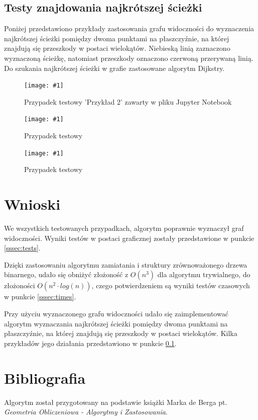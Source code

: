 \documentclass[12pt]{article}
\let\tempone\itemize
\let\temptwo\enditemize
\renewenvironment{itemize}{\tempone\setlength{\itemsep}{0cm}}{\temptwo}
\newcommand{\imgcustomsize}[3]{
	\begin{figure}[H]
		\centering
		\texttt{[image: \#1]}
		\caption{#2}
		\label{#1}
	\end{figure}
}
\begin{document}
		\subsection{Testy znajdowania najkrótszej ścieżki} \label{sssec:tests2}
			
			Poniżej przedstawiono przykłady zastosowania grafu widoczności do wyznaczenia najkrótszej ścieżki pomiędzy dwoma punktami na płaszczyźnie, na której znajdują się przeszkody w postaci wielokątów. Niebieską linią zaznaczono wyznaczoną ścieżkę, natomiast przeszkody oznaczono czerwoną przerywaną linią. Do szukania najkrótszej ścieżki w grafie zastosowane algorytm Dijkstry.
		
			\imgcustomsize{przyklad2.jpg}{Przypadek testowy 'Przykład 2' zawarty w pliku Jupyter Notebook}{1}
			\imgcustomsize{p1.jpg}{Przypadek testowy}{0.75}
			\imgcustomsize{p2.jpg}{Przypadek testowy}{0.75}
			\newpage
			
	\section{Wnioski}
		\begin{itemize}
			\item We wszystkich testowanych przypadkach, algorytm poprawnie wyznaczył graf widoczności. Wyniki testów w postaci graficznej zostały przedstawione w punkcie \ref{sssec:tests}.
			\item Dzięki zastosowaniu algorytmu zamiatania i struktury zrównoważonego drzewa binarnego, udało się obniżyć złożoność z $ O(n^3) $ dla algorytmu trywialnego, do złożoności $ O(n^2 \cdot log(n)) $, czego potwierdzeniem są wyniki testów  czasowych w punkcie \ref{sssec:times}.
			\item Przy użyciu wyznaczonego grafu widoczności udało się zaimplementować algorytm wyznaczania najkrótszej ścieżki pomiędzy dwoma punktami na płaszczyźnie, na której znajdują się przeszkody w postaci wielokątów. Kilka przykładów jego działania przedstawiono w punkcie \ref{sssec:tests2}.
			
			
		\end{itemize}
	
	\section{Bibliografia}
		Algorytm został przygotowany na podstawie książki Marka de Berga pt. \textit{Geometria Obliczeniowa - Algorytmy i Zastosowania}.
\end{document}
